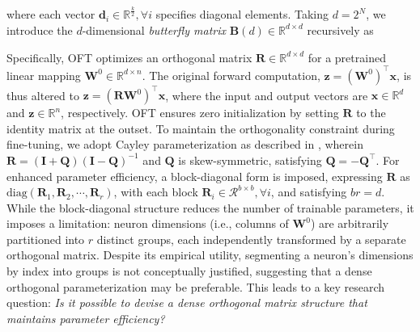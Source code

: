 where each vector $\bm{d}_i\in\mathbb{R}^{\frac{k}{2}},\forall i$ specifies diagonal elements. Taking $d=2^N$, we introduce the $d$-dimensional \emph{butterfly matrix} $\bm{B}(d)\in\mathbb{R}^{d\times d}$ recursively as

Specifically, OFT optimizes an orthogonal matrix $\bm{R}\in\mathbb{R}^{d\times d}$ for a pretrained linear mapping $\bm{W}^0\in\mathbb{R}^{d\times n}$. The original forward computation, $\bm{z}=(\bm{W}^0)^\top\bm{x}$, is thus altered to $\bm{z}=(\bm{R}\bm{W}^0)^\top\bm{x}$, where the input and output vectors are $\bm{x}\in\mathbb{R}^{d}$ and $\bm{z}\in\mathbb{R}^{n}$, respectively. OFT ensures zero initialization by setting $\bm{R}$ to the identity matrix at the outset. To maintain the orthogonality constraint during fine-tuning, we adopt Cayley parameterization as described in \cite{qiu2023controlling,liu2021orthogonal}, wherein $\bm{R}=(\bm{I}+\bm{Q})(\bm{I}-\bm{Q})^{-1}$ and $\bm{Q}$ is skew-symmetric, satisfying $\bm{Q}=-\bm{Q}^\top$. For enhanced parameter efficiency, a block-diagonal form is imposed, expressing $\bm{R}$ as $\text{diag}(\bm{R}_1,\bm{R}_2,\cdots,\bm{R}_r)$, with each block $\bm{R}_i\in\mathcal{R}^{b\times b},\forall i$, and satisfying $br=d$. While the block-diagonal structure reduces the number of trainable parameters, it imposes a limitation: neuron dimensions (i.e., columns of $\bm{W}^0$) are arbitrarily partitioned into $r$ distinct groups, each independently transformed by a separate orthogonal matrix. Despite its empirical utility, segmenting a neuron's dimensions by index into groups is not conceptually justified, suggesting that a dense orthogonal parameterization may be preferable. This leads to a key research question: \emph{Is it possible to devise a dense orthogonal matrix structure that maintains parameter efficiency?}

